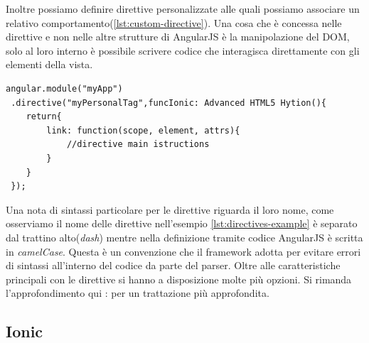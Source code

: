 \begin{description}
Inoltre possiamo definire direttive personalizzate alle quali possiamo associare un relativo comportamento(\ref{lst:custom-directive}). Una cosa che è concessa nelle direttive e non nelle altre strutture di AngularJS è la manipolazione del DOM, solo al loro interno è possibile scrivere codice che interagisca direttamente con gli elementi della vista.
\begin{lstlisting}[language=html,caption={Un esempio di direttiva personalizzata},
				   label={lst:custom-directive}]
 angular.module("myApp")
 .directive("myPersonalTag",funcIonic: Advanced HTML5 Hytion(){
	return{
		link: function(scope, element, attrs){
			//directive main istructions		
		}	
	} 
 });
\end{lstlisting}

Una nota di sintassi particolare per le direttive riguarda il loro nome, come osserviamo il nome delle direttive nell'esempio \ref{lst:directives-example} è separato dal trattino alto(\emph{dash}) mentre nella definizione tramite codice AngularJS è scritta in \emph{camelCase}. Questa è un convenzione che il framework adotta per evitare errori di sintassi all'interno del codice da parte del parser.
Oltre alle caratteristiche principali con le direttive si hanno a disposizione molte più opzioni. Si rimanda l'approfondimento qui : \cite{angularjs:directives} per un trattazione più approfondita.

\end{description} 


\subsection{Ionic}

